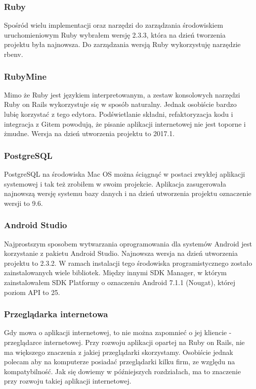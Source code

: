 \subsubsection{Ruby}
Spośród wielu implementacji oraz narzędzi do zarządzania środowiskiem uruchomieniowym Ruby wybrałem wersję 2.3.3, która na dzień tworzenia projektu była najnowsza. Do zarządzania wersją Ruby wykorzystuję narzędzie rbenv. 

\subsubsection{RubyMine}
Mimo że Ruby jest językiem interpretowanym, a zestaw konsolowych narzędzi Ruby on Rails wykorzystuje się w sposób naturalny. Jednak osobiście bardzo lubię korzystać z tego edytora. Podświetlanie składni, refaktoryzacja kodu i integracja z Gitem powodują, że pisanie aplikacji internetowej nie jest toporne i żmudne. Wersja na dzień utworzenia projektu to 2017.1.

\subsubsection{PostgreSQL}
PostgreSQL na środowiska Mac OS można ściągnąć w postaci zwykłej aplikacji systemowej i tak też zrobiłem w swoim projekcie. Aplikacja zasugerowała najnowszą wersję systemu bazy danych i na dzień utworzenia projektu oznaczenie wersji to 9.6.

\subsubsection{Android Studio}
Najprostszym sposobem wytwarzania oprogramowania dla systemów Android jest korzystanie z pakietu Android Studio. Najnowsza wersja na dzień utworzenia projektu to 2.3.2. W ramach instalacji tego środowiska programistycznego zostało zainstalowanych wiele bibliotek. Między innymi SDK Manager, w którym zainstalowałem SDK Platformy o oznaczeniu Android 7.1.1 (Nougat), której poziom API to 25.

\subsubsection{Przeglądarka internetowa}
Gdy mowa o aplikacji internetowej, to nie można zapomnieć o jej kliencie - przeglądarce internetowej. Przy rozwoju aplikacji opartej na Ruby on Rails, nie ma większego znaczenia z jakiej przeglądarki skorzystamy. Osobiście jednak polecam aby na komputerze posiadać przeglądarki kilku firm, ze względu na kompatybilność. Jak się dowiemy w późniejszych rozdziałach, ma to znaczenie przy rozwoju takiej aplikacji internetowej.

